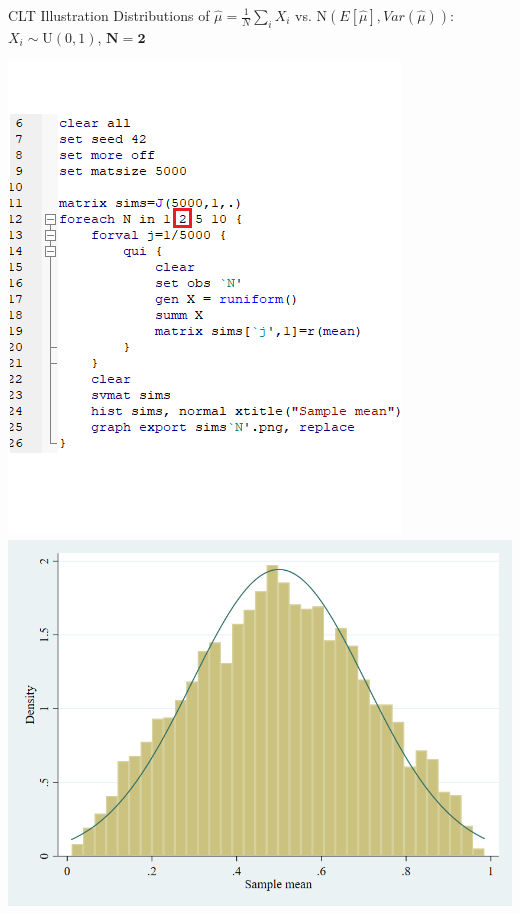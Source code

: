 \documentclass[11pt,english,handout]{beamer}
\begin{document}
\begin{frame}{CLT Illustration}
	\vspace{0.2cm}
	Distributions of $\hat{\mu}=\frac{1}{N}\sum_i X_i$ vs. $\mathrm{N}(E[\hat\mu],Var(\hat{\mu}))$: $X_i\sim \mathrm{U}(0,1)$, $\mathbf{N=2}$
	
	\begin{center}
		\includegraphics[scale=0.4]{Stata2.png} \includegraphics[scale=0.25]{sims2.png}
	\end{center}
	
\end{frame}
\end{document}
